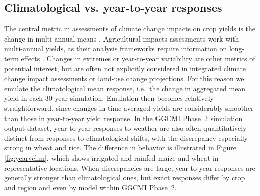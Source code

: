 \documentclass[gmdd]{copernicus} %
\begin{document}
\subsection{Climatological vs. year-to-year responses}
\label{S:2b}
The central metric in assessments of climate change impacts on crop yields is the change in multi-annual means \citep[e.g.][]{Schlenker2009, Challinor2014, Rosenzweig2014, Muller_2015_implications, zhao2016plausible, hsiang_estimating_2017}.
Agricultural impacts assessments work with multi-annual yields, as their analysis frameworks require information on long-term effects %
\citep[e.g.][]{nelson2014climate, Stevanovic2016, Wiebe_2015, hasegawa2018risk, Snyder2018}.
Changes in extremes or year-to-year variability are other metrics of potential interest, but are often not explicitly considered in integrated climate change impact assessments or land-use change projections. %
For this reason we emulate the climatological mean response, i.e.\ the change in aggregated mean yield in each 30-year simulation.
Emulation then becomes relatively straightforward, since changes in time-averaged yields are considerably smoother than those in year-to-year yield response.
In the GGCMI Phase~2 simulation output dataset, year-to-year responses to weather are also often quantitatively distinct from responses to climatological shifts, with the discrepancy especially strong in wheat and rice. 
The difference in behavior is illustrated in Figure \ref{fig:yearvclim}, which shows irrigated and rainfed maize and wheat in representative locations.
When discrepancies are large, year-to-year responses are generally stronger than climatological ones, but exact responses differ by crop and region and even by model within GGCMI Phase~2. 
\end{document}
